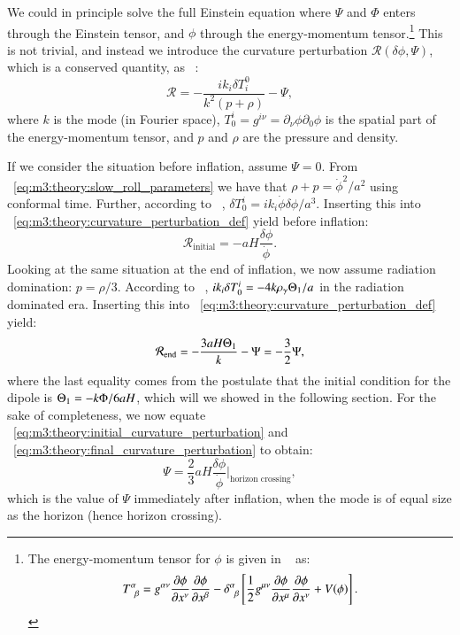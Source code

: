     We could in principle solve the full Einstein equation where $\Psi$ and $\Phi$ enters through the Einstein tensor, and $\phi$ through the energy-momentum tensor.\footnote{The energy-momentum tensor for $\phi$ is given in ~\cite[Eq. 7.6]{dodelson2020modern} as: $$ T^\alpha_{\;\;\beta}=g^{\alpha\nu}\pdv{\phi}{x^\nu}\pdv{\phi}{x^\beta}-\delta^\alpha_{\;\;\beta}\left[\frac{1}{2}g^{\mu\nu}\pdv{\phi}{x^\mu}\pdv{\phi}{x^\nu}+V(\phi)\right]. $$} This is not trivial, and instead we introduce the curvature perturbation $\mathcal{R}(\delta\phi, \Psi)$, which is a conserved quantity, as ~\cite{dodelson2020modern}:
    \begin{equation}\label{eq:m3:theory:curvature_perturbation_def}
        \mathcal{R} = -\frac{ik_i\delta T^0_i}{k^2(p+\rho)}-\Psi,
    \end{equation}
    where $k$ is the mode (in Fourier space), $T^i_0 = g^{i\nu}=\partial_\nu\phi\partial_0\phi$ is the spatial part of the energy-momentum tensor, and $p$ and $\rho$ are the pressure and density. 

    If we consider the situation before inflation, assume $\Psi=0$. From ~\cref{eq:m3:theory:slow_roll_parameters} we have that $\rho+p=\dot{\phi}^2/a^2$ using conformal time. Further, according to ~\cite[Eq. 7.47]{dodelson2020modern}, $\delta T^i_0=ik_i\dot{\phi}\delta\phi/a^3$. Inserting this into ~\cref{eq:m3:theory:curvature_perturbation_def} yield before inflation:
    \begin{equation}\label{eq:m3:theory:initial_curvature_perturbation}
        \mathcal{R}_\mathrm{initial} = -aH\frac{\delta\phi}{\dot{\phi}}.
    \end{equation}
    Looking at the same situation at the end of inflation, we now assume radiation domination: $p=\rho/3$. According to ~\cite{dodelson2020modern}, $ik_i\delta T^i_0 = -4k\rho_\gamma\Theta_1/a$ in the radiation dominated era. Inserting this into ~\cref{eq:m3:theory:curvature_perturbation_def} yield:
    \begin{equation}\label{eq:m3:theory:final_curvature_perturbation}
        \mathcal{R}_\mathrm{end} = -\frac{3aH\Theta_1}{k}-\Psi = -\frac{3}{2}\Psi,
    \end{equation}
    where the last equality comes from the postulate that the initial condition for the dipole is $\Theta_1=-k\Phi/6aH$, which will we showed in the following section. For the sake of completeness, we now equate ~\cref{eq:m3:theory:initial_curvature_perturbation} and ~\cref{eq:m3:theory:final_curvature_perturbation} to obtain:
    \begin{equation}\label{eq:m3:theory:final_Psi_after_inflation}
        \Psi = \frac{2}{3}aH\frac{\delta\phi}{\dot{\phi}}\Big|_\text{horizon crossing},
    \end{equation}
    which is the value of $\Psi$ immediately after inflation, when the mode is of equal size as the horizon (hence horizon crossing).
